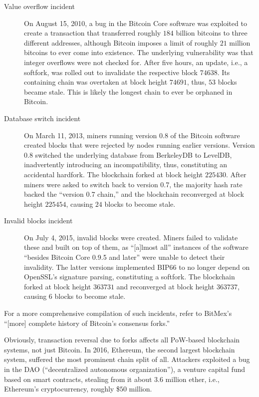 \begin{description}
\item[Value overflow incident]
On August 15, 2010, a bug in the Bitcoin Core software was exploited to create a transaction that transferred roughly \(184\) billion bitcoins to three different addresses, although Bitcoin imposes a limit of roughly \(21\) million bitcoins to ever come into existence.
The underlying vulnerability was that integer overflows were not checked for.
After five hours, an update, i.e., a softfork, was rolled out to invalidate the respective block \(74638\).
Its containing chain was overtaken at block height \(74691\), thus, \(53\) blocks became stale.
\autocite{bitcoinwiki2016valueoverflowincident}
This is likely the longest chain to ever be orphaned in Bitcoin.
\item[Database switch incident]
On March 11, 2013, miners running version 0.8 of the Bitcoin software created blocks that were rejected by nodes running earlier versions.
Version 0.8 switched the underlying database from BerkeleyDB to LevelDB, inadvertently introducing an incompatibility, thus, constituting an accidental hardfork.
The blockchain forked at block height \(225430\).
After miners were asked to switch back to version 0.7, the majority hash rate backed the ``version 0.7 chain,'' and the blockchain reconverged at block height \(225454\), causing \(24\) blocks to become stale.
\autocite{buterin2013}
\item[Invalid blocks incident]
On July 4, 2015, invalid blocks were created.
Miners failed to validate these and built on top of them, as ``[a]lmost all''  instances of the software ``besides Bitcoin Core 0.9.5 and later'' were unable to detect their invalidity. \autocite{bitcoin2015invalidblocks}
The latter versions implemented BIP66 \autocite{github2015bip66} to no longer depend on OpenSSL's signature parsing, constituting a softfork.
The blockchain forked at block height \(363731\) and reconverged at block height \(363737\), causing \(6\) blocks to become stale.
\autocite{rbitcoin2015invalidblocks}
\end{description}

For a more comprehensive compilation of such incidents, refer to BitMex's ``[more] complete history of Bitcoin's consensus forks.'' \autocite{bitmex2262}

Obviously, transaction reversal due to forks affects all PoW-based blockchain systems, not just Bitcoin.
In 2016, Ethereum, the second largest blockchain system, suffered the most prominent chain split of all.
Attackers exploited a bug in the DAO (``decentralized autonomous organization''), a venture capital fund based on smart contracts, stealing from it about \(3.6\) million ether, i.e., Ethereum's cryptocurrency, roughly \$\(50\) million. \autocite[75]{dhillon2017}

